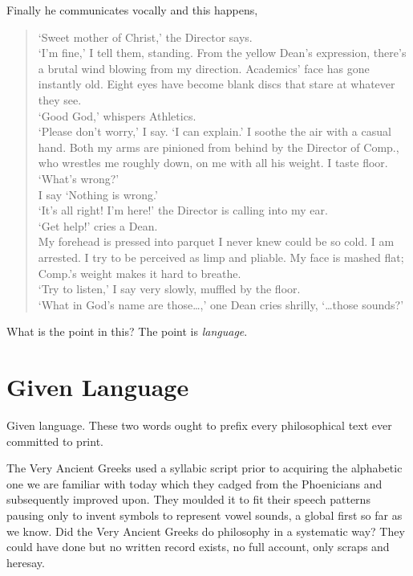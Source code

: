 \documentclass[dah,phd,a4paper]{xe_uccthesis}
\begin{document}
	Finally he communicates vocally and this happens,
\begin{quotation}
	‘Sweet mother of Christ,’ the Director says.\\	
	‘I’m fine,’ I tell them, standing. From the yellow Dean’s expression, there’s a brutal wind blowing from my direction. Academics’ face has gone instantly old. Eight eyes have become blank discs that stare at whatever they see.\\	
	‘Good God,’ whispers Athletics.\\	
	‘Please don’t worry,’ I say. ‘I can explain.’ I soothe the air with a casual hand.
	Both my arms are pinioned from behind by the Director of Comp., who wrestles me roughly down, on me with all his weight. I taste floor.\\
	‘What’s wrong?’\\
	I say ‘Nothing is wrong.’\\
	‘It’s all right! I’m here!’ the Director is calling into my ear.\\
	‘Get help!’ cries a Dean.\\
	My forehead is pressed into parquet I never knew could be so cold. I am arrested. I try to be perceived as limp and pliable. My face is mashed flat; Comp.’s weight makes it hard to breathe.\\
	‘Try to listen,’ I say very slowly, muffled by the floor.\\
	‘What in God’s name are those…,’ one Dean cries shrilly, ‘…those sounds?’\\
\begin{flushright}
\citep[See][opening sequence]{wallace_infinite_1997}
\end{flushright}
\end{quotation}
	What is the point in this? The point is \emph{language}.

\section{Given Language}

Given language. These two words ought to prefix every philosophical text ever committed to print.

The Very Ancient Greeks used a syllabic script prior to acquiring the alphabetic one we are familiar with today which they cadged from the Phoenicians and subsequently improved upon\citep[See][ch. 1]{suarez_book:_2013}. They moulded it to fit their speech patterns pausing only to invent symbols to represent vowel sounds, a global first so far as we know. Did the Very Ancient Greeks do philosophy in a systematic way? They could have done but no written record exists, no full account, only scraps and heresay.
\end{document}
